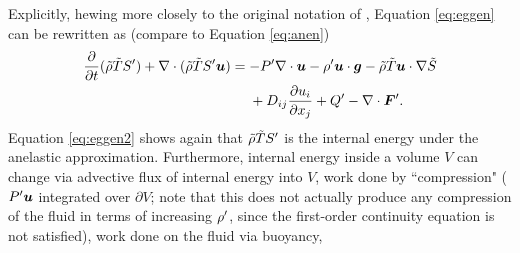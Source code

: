 \documentclass[12pt]{article}
\newcommand{\vecf}{\bm{F}}
\newcommand{\heatmassflux}{Q_{\rm massflux}}
\begin{document}
Explicitly, hewing more closely to the original notation of \citet{Gough1969}, Equation \eqref{eq:eggen} can be rewritten as (compare to Equation \eqref{eq:anen})
\begin{align}\label{eq:eggen2}
\pderiv{}{t}(\rhotilde\tmptilde\entrprime)+ \Div(\rhotilde\tmptilde \entrprime\vecu) &= -\prsprime\Div\vecu -\rhoprime \vecu\cdot \vecg- \rhotilde\tmptilde \ugrad \entrtilde\nonumber\\
&\ \ \ \ +D_{ij}\pderiv{u_i}{x_j} + Q^\prime- \Div\vecf^\prime.
\end{align}
Equation \eqref{eq:eggen2} shows again that $\tilde{\rho}\tilde{T} {S^\prime}$ is the internal energy under the anelastic approximation. Furthermore, internal energy inside a volume $V$ can change via advective flux of internal energy into $V$, work done by ``compression" (${P^\prime}\bm{u}$ integrated over $\partial V$; note that this does not actually produce any compression of the fluid in terms of increasing ${\rho^\prime}$, since the first-order continuity equation is not satisfied), work done on the fluid via buoyancy, 

\end{document}
